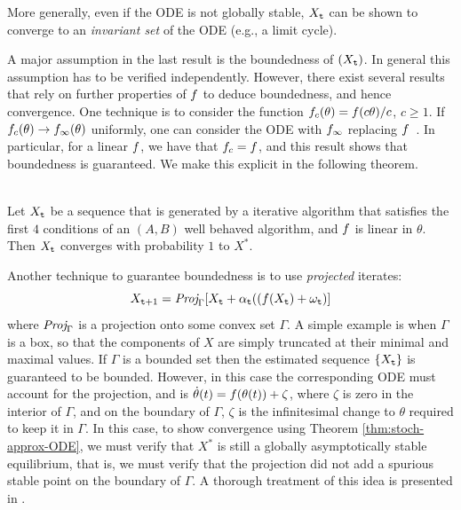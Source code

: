\begin{remark}
More generally, even if the ODE is not globally stable, $X_{\tt t}$ can be shown to converge
to an {\em invariant set} of the ODE (e.g., a limit cycle).
\end{remark}
\begin{remark}
A major assumption in the last result is the boundedness of $(X_{\tt t})$.
In general this assumption has to be verified independently. However, there
exist several results that rely on further properties of $f$ to deduce
boundedness, and hence convergence. One technique is to consider the function $f_c(\theta) = f(c \theta) / c$, $c\geq 1$. If $f_c(\theta) \to f_\infty(\theta)$ uniformly, one can consider the ODE with $f_\infty$ replacing $f$~\cite{borkar2009stochastic}. In particular, for a linear $f$, we have that $f_c = f$, and this result shows that boundedness is guaranteed. We make this explicit in the following theorem.
\begin{theorem}\ \\
\label{thm:stoch-approx-ODE-linear}
 Let $X_{\tt t}$ be a sequence that is generated by a
iterative algorithm that satisfies the first $4$ conditions of an $(A,B)$ well behaved algorithm, and $f$ is linear in $\theta$. Then $X_{\tt t}$
converges with probability $1$ to $X^*$.
\end{theorem}
\end{remark}
\begin{remark}
Another technique to guarantee boundedness
is to use \textit{projected} iterates:
$$
X_{{\tt t}+1} = \text{\it Proj}_\Gamma [X_{\tt t}+\alpha_{\tt t}((f(X_{\tt t})+\omega_{\tt t}) ]
$$
where $\text{\it Proj}_\Gamma$ is a projection onto some convex set $\Gamma$.
A simple example is when $\Gamma$ is a box, so that the components of $X$ are simply truncated at their minimal and maximal values. 
If $\Gamma$ is a bounded set then the estimated sequence $\{X_{\tt t}\}$ is guaranteed
to be bounded. However, in this case the corresponding ODE must account for the projection, and is $\dot \theta(t) = f(\theta(t)) + \zeta$, where $\zeta$ is zero in the interior of $\Gamma$, and on the boundary of $\Gamma$, $\zeta$ is the infinitesimal change to $\theta$ required to keep it in $\Gamma$. In this case, to show convergence using Theorem \ref{thm:stoch-approx-ODE}, we must verify that $X^*$ is still a globally asymptotically stable equilibrium, that is, we must verify that the projection did not add a spurious stable point on the boundary of $\Gamma$. A thorough treatment of this idea is presented in \cite{kushner2003stochastic}.
\end{remark}



